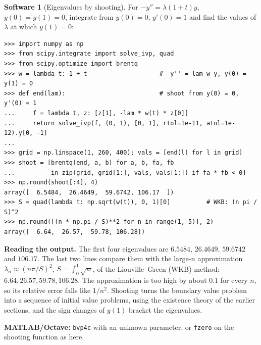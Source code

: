 \documentclass[11pt,a4paper]{article}
\numberwithin{equation}{section}
\theoremstyle{definition}
\newtheorem{software}[thm]{Software}
\begin{document}
\begin{software}[Eigenvalues by shooting]
\label{sw:shooting}
For $-y'' = \lambda(1 + t)y$, $y(0) = y(1) = 0$, integrate from $y(0) = 0$, $y'(0) = 1$ and find the values of $\lambda$ at which $y(1) = 0$:
{\small\begin{verbatim}
>>> import numpy as np
>>> from scipy.integrate import solve_ivp, quad
>>> from scipy.optimize import brentq
>>> w = lambda t: 1 + t                    # -y'' = lam w y, y(0) = y(1) = 0
>>> def end(lam):                          # shoot from y(0) = 0, y'(0) = 1
...     f = lambda t, z: [z[1], -lam * w(t) * z[0]]
...     return solve_ivp(f, (0, 1), [0, 1], rtol=1e-11, atol=1e-12).y[0, -1]
...
>>> grid = np.linspace(1, 260, 400); vals = [end(l) for l in grid]
>>> shoot = [brentq(end, a, b) for a, b, fa, fb
...          in zip(grid, grid[1:], vals, vals[1:]) if fa * fb < 0]
>>> np.round(shoot[:4], 4)
array([  6.5484,  26.4649,  59.6742, 106.17  ])
>>> S = quad(lambda t: np.sqrt(w(t)), 0, 1)[0]          # WKB: (n pi / S)^2
>>> np.round([(n * np.pi / S)**2 for n in range(1, 5)], 2)
array([  6.64,  26.57,  59.78, 106.28])
\end{verbatim}}
\textbf{Reading the output.} The first four eigenvalues are $6.5484$, $26.4649$, $59.6742$ and $106.17$. The last two lines compare them with the large-$n$ approximation $\lambda_n \approx (n\pi/S)^2$,
$S = \int_0^1\sqrt{w}$, of the Liouville--Green (WKB) method: $6.64, 26.57, 59.78, 106.28$. The approximation is too high by about $0.1$ for every $n$, so its relative error falls like $1/n^2$. Shooting
turns the boundary value problem into a sequence of initial value problems, using the existence theory of the earlier sections, and the sign changes of $y(1)$ bracket the eigenvalues.

\textbf{MATLAB/Octave:} \texttt{bvp4c} with an unknown parameter, or \texttt{fzero} on the shooting function as here.
\end{software}
\end{document}
